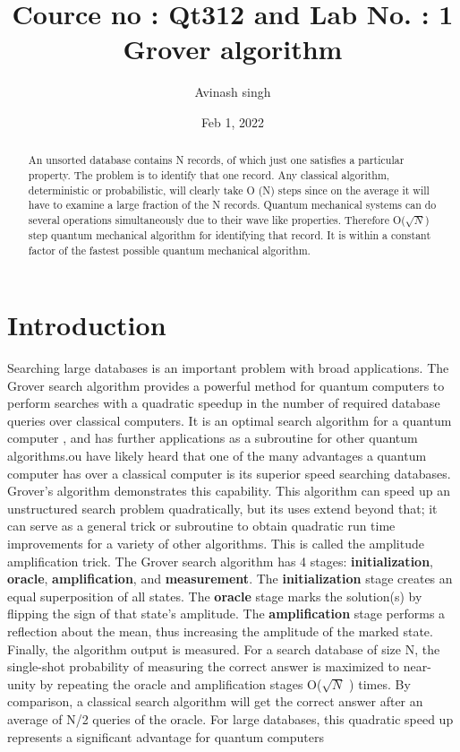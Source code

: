 \documentclass[letterpaper,11pt]{article}
\begin{document}
\title{Cource no : Qt312 and Lab No. : 1 \\\textbf{Grover algorithm}}
\author{Avinash singh}
\date{Feb 1, 2022}
\maketitle

\begin{abstract}
An unsorted database contains N records, of which just
one satisfies a particular property. The problem is to
identify that one record. Any classical algorithm, deterministic or probabilistic, will clearly take O (N) steps
since on the average it will have to examine a large fraction of the N records. Quantum mechanical systems can
do several operations simultaneously due to their wave
like properties. Therefore  O($\sqrt{N}$) step quantum mechanical algorithm for identifying that record. It
is within a constant factor of the fastest possible quantum mechanical algorithm.
\end{abstract}

\section{Introduction}

Searching large databases is an important
problem with broad applications. The Grover
search algorithm provides a powerful
method for quantum computers to perform
searches with a quadratic speedup in the number of required database queries over classical
computers. It is an optimal search algorithm for
a quantum computer , and has further applications as a subroutine for other quantum algorithms.ou have likely heard that one of the many advantages a quantum computer has over a classical computer is its superior speed searching databases. Grover's algorithm demonstrates this capability. This algorithm can speed up an unstructured search problem quadratically, but its uses extend beyond that; it can serve as a general trick or subroutine to obtain quadratic run time improvements for a variety of other algorithms. This is called the amplitude amplification trick.
\newline
\newline
The Grover search algorithm has 4 stages: \textbf {initialization}, \textbf{oracle}, \textbf{amplification}, and \textbf{measurement}. The \textbf {initialization} stage creates an equal
superposition of all states. The \textbf {oracle} stage marks the
solution(s) by flipping the sign of that state’s amplitude.
The \textbf{amplification} stage performs a reflection about the
mean, thus increasing the amplitude of the marked state.
Finally, the algorithm output is measured. For a search
database of size N, the single-shot probability of measuring the correct answer is maximized to near-unity by repeating the oracle and amplification stages O($\sqrt{N}$
) times. By comparison, a classical search algorithm will
get the correct answer after an average of N/2 queries of
the oracle. For large databases, this quadratic speed up represents a significant advantage for quantum computers
\end{document}
